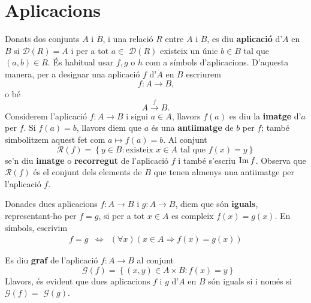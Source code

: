 \section{Aplicacions}

Donats dos conjunts $A$ i $B$, i una relació $R$ entre $A$ i $B$, es diu
\textbf{aplicació} d'$A$ en $B$ si $\mathcal{D}\left( R\right) =A$ i per
a tot $a\in$ $\mathcal{D}\left( R\right) $ existeix un únic $b\in B$ tal
que $(a,b)\in R$. És habitual usar $f,g$ o $h$ com a símbols
d'aplicacions. D'aquesta manera, per a designar una aplicació $f$ d'$A$
en $B$ escriurem%
\begin{equation*}
f:A\longrightarrow B\text{,}
\end{equation*}
o bé%
\begin{equation*}
A\overset{f}{\longrightarrow}B\text{.}
\end{equation*}
Considerem l'aplicació $f:A\longrightarrow B$ i sigui $a\in A$, llavors 
$f(a)$ es diu la \textbf{imatge} d'$a$ per $f$. Si $f(a)=b$, llavors diem que
$a$ és una \textbf{antiimatge} de $b$ per $f$; també simbolitzem
aquest fet com $a\longmapsto f(a)=b$. Al conjunt%
\begin{equation*}
\mathcal{R}\left( f\right) =\left\{ y\in B:\text{existeix }x\in A\text{ tal
que }f(x)=y\right\}
\end{equation*}
se'n diu \textbf{imatge} o \textbf{recorregut} de l'aplicació $f$ i també s'escriu $\operatorname{Im}f$. Observa que $\mathcal{R}\left( f\right) $ és el conjunt dels elements de $B$ que tenen almenys una antiimatge per
l'aplicació $f$.

\bigskip

Donades dues aplicacions $f:A\longrightarrow B$ i $g:A\longrightarrow B$,
diem que són \textbf{iguals}, representant-ho per $f=g$, si per a tot $%
x\in A$ es compleix $f(x)=g(x)$. En símbols, escrivim%
\begin{equation*}
\begin{array}{ccc}
f=g & \Longleftrightarrow & \left( \forall x\right) \left( x\in
A\Longrightarrow f(x)=g(x)\right)%
\end{array}
\end{equation*}

\bigskip

Es diu \textbf{graf} de l'aplicació $f:A\longrightarrow B$ al conjunt%
\begin{equation*}
\text{ }\mathcal{G}\left( f\right) =\left\{ (x,y)\in A\times
B:f(x)=y\right\}
\end{equation*}
Llavors, és evident que dues aplicacions $f$ i $g$ d'$A$ en $B$ són
iguals si i només si $\mathcal{G}\left( f\right) =$ $\mathcal{G}\left(
g\right) $.

